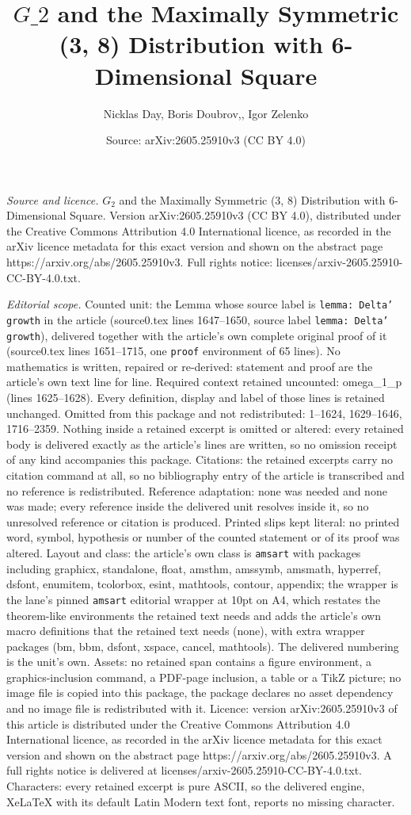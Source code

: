 \documentclass[10pt,a4paper]{amsart}
\title[$G\_2$ and the Maximally Symmetric (3, 8) Distribution with 6]{$G\_2$ and the Maximally Symmetric (3, 8) Distribution with 6-Dimensional Square}
\author{Nicklas Day, Boris Doubrov,, Igor Zelenko}
\date{Source: arXiv:2605.25910v3 (CC BY 4.0)}
\begin{document}
\maketitle

\noindent\emph{Source and licence.} $G_2$ and the Maximally Symmetric (3, 8) Distribution with 6-Dimensional Square. Version arXiv:2605.25910v3 (CC BY 4.0), distributed under the Creative Commons Attribution 4.0 International licence, as recorded in the arXiv licence metadata for this exact version and shown on the abstract page https://arxiv.org/abs/2605.25910v3. Full rights notice: licenses/arxiv-2605.25910-CC-BY-4.0.txt.\par\smallskip

\noindent\textit{Editorial scope.} Counted unit: the Lemma whose source label is \texttt{lemma: Delta' growth} in the article (source0.tex lines 1647--1650, source label \texttt{lemma: Delta' growth}), delivered together with the article's own complete original proof of it (source0.tex lines 1651--1715, one \texttt{proof} environment of 65 lines). No mathematics is written, repaired or re-derived: statement and proof are the article's own text line for line. Required context retained uncounted: omega\_1\_p (lines 1625--1628). Every definition, display and label of those lines is retained unchanged. Omitted from this package and not redistributed: 1--1624, 1629--1646, 1716--2359. Nothing inside a retained excerpt is omitted or altered: every retained body is delivered exactly as the article's lines are written, so no omission receipt of any kind accompanies this package. Citations: the retained excerpts carry no citation command at all, so no bibliography entry of the article is transcribed and no reference is redistributed. Reference adaptation: none was needed and none was made; every reference inside the delivered unit resolves inside it, so no unresolved reference or citation is produced. Printed slips kept literal: no printed word, symbol, hypothesis or number of the counted statement or of its proof was altered. Layout and class: the article's own class is \texttt{amsart} with packages including graphicx, standalone, float, amsthm, amssymb, amsmath, hyperref, dsfont, enumitem, tcolorbox, esint, mathtools, contour, appendix; the wrapper is the lane's pinned \texttt{amsart} editorial wrapper at 10pt on A4, which restates the theorem-like environments the retained text needs and adds the article's own macro definitions that the retained text needs (none), with extra wrapper packages (bm, bbm, dsfont, xspace, cancel, mathtools). The delivered numbering is the unit's own. Assets: no retained span contains a figure environment, a graphics-inclusion command, a PDF-page inclusion, a table or a TikZ picture; no image file is copied into this package, the package declares no asset dependency and no image file is redistributed with it. Licence: version arXiv:2605.25910v3 of this article is distributed under the Creative Commons Attribution 4.0 International licence, as recorded in the arXiv licence metadata for this exact version and shown on the abstract page https://arxiv.org/abs/2605.25910v3. A full rights notice is delivered at licenses/arxiv-2605.25910-CC-BY-4.0.txt. Characters: every retained excerpt is pure ASCII, so the delivered engine, XeLaTeX with its default Latin Modern text font, reports no missing character.
\end{document}
